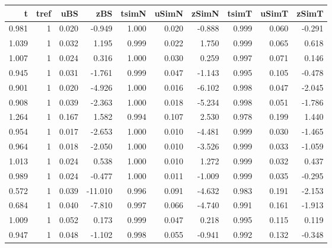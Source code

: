 
\begin{tabular}{r|r|r|r|r|r|r|r|r|r}
\hline
t & tref & uBS & zBS & tsimN & uSimN & zSimN & tsimT & uSimT & zSimT\\
\hline
0.981 & 1 & 0.020 & -0.949 & 1.000 & 0.020 & -0.888 & 0.999 & 0.060 & -0.291\\
\hline
1.039 & 1 & 0.032 & 1.195 & 0.999 & 0.022 & 1.750 & 0.999 & 0.065 & 0.618\\
\hline
1.007 & 1 & 0.024 & 0.316 & 1.000 & 0.030 & 0.259 & 0.997 & 0.071 & 0.146\\
\hline
0.945 & 1 & 0.031 & -1.761 & 0.999 & 0.047 & -1.143 & 0.995 & 0.105 & -0.478\\
\hline
0.901 & 1 & 0.020 & -4.926 & 1.000 & 0.016 & -6.102 & 0.998 & 0.047 & -2.045\\
\hline
0.908 & 1 & 0.039 & -2.363 & 1.000 & 0.018 & -5.234 & 0.998 & 0.051 & -1.786\\
\hline
1.264 & 1 & 0.167 & 1.582 & 0.994 & 0.107 & 2.530 & 0.978 & 0.199 & 1.440\\
\hline
0.954 & 1 & 0.017 & -2.653 & 1.000 & 0.010 & -4.481 & 0.999 & 0.030 & -1.465\\
\hline
0.964 & 1 & 0.018 & -2.050 & 1.000 & 0.010 & -3.526 & 0.999 & 0.033 & -1.059\\
\hline
1.013 & 1 & 0.024 & 0.538 & 1.000 & 0.010 & 1.272 & 0.999 & 0.032 & 0.437\\
\hline
0.989 & 1 & 0.024 & -0.477 & 1.000 & 0.011 & -1.009 & 0.999 & 0.035 & -0.295\\
\hline
0.572 & 1 & 0.039 & -11.010 & 0.996 & 0.091 & -4.632 & 0.983 & 0.191 & -2.153\\
\hline
0.684 & 1 & 0.040 & -7.810 & 0.997 & 0.066 & -4.740 & 0.991 & 0.161 & -1.913\\
\hline
1.009 & 1 & 0.052 & 0.173 & 0.999 & 0.047 & 0.218 & 0.995 & 0.115 & 0.119\\
\hline
0.947 & 1 & 0.048 & -1.102 & 0.998 & 0.055 & -0.941 & 0.992 & 0.132 & -0.348\\
\hline
\end{tabular}
